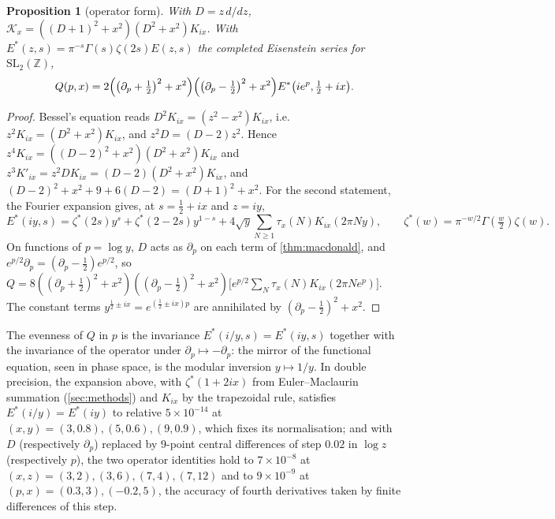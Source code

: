 \documentclass[11pt]{article}
\newtheorem{proposition}[theorem]{Proposition}
\theoremstyle{definition}\newtheorem{definition}[theorem]{Definition}
\theoremstyle{remark}\newtheorem{remark}[theorem]{Remark}
\begin{document}
\begin{proposition}[operator form]\label{prop:operator}
With $D=z\,d/dz$, $\mathcal K_x=((D+1)^2+x^2)(D^2+x^2)K_{ix}$. With $E^*(z,s)=\pi^{-s}\Gamma(s)\zeta(2s)E(z,s)$ the completed Eisenstein series for $\mathrm{SL}_2(\mathbb Z)$,
\[
Q(p,x)=2\Bigl(\bigl(\partial_p+\tfrac12\bigr)^2+x^2\Bigr)\Bigl(\bigl(\partial_p-\tfrac12\bigr)^2+x^2\Bigr)E^*\bigl(ie^p,\tfrac12+ix\bigr).
\]
\end{proposition}
\begin{proof}
Bessel's equation reads $D^2K_{ix}=(z^2-x^2)K_{ix}$, i.e.\ $z^2K_{ix}=(D^2+x^2)K_{ix}$, and $z^2D=(D-2)z^2$. Hence $z^4K_{ix}=((D-2)^2+x^2)(D^2+x^2)K_{ix}$ and $z^3K'_{ix}=z^2DK_{ix}=(D-2)(D^2+x^2)K_{ix}$, and $(D-2)^2+x^2+9+6(D-2)=(D+1)^2+x^2$. For the second statement, the Fourier expansion \cite[\S3.4]{Iwaniec} gives, at $s=\frac12+ix$ and $z=iy$,
\[
E^*(iy,s)=\zeta^*(2s)y^s+\zeta^*(2-2s)y^{1-s}+4\sqrt y\sum_{N\ge1}\tau_x(N)K_{ix}(2\pi Ny),\qquad\zeta^*(w)=\pi^{-w/2}\Gamma(\tfrac w2)\zeta(w).
\]
On functions of $p=\log y$, $D$ acts as $\partial_p$ on each term of \cref{thm:macdonald}, and $e^{p/2}\partial_p=(\partial_p-\frac12)e^{p/2}$, so $Q=8((\partial_p+\frac12)^2+x^2)((\partial_p-\frac12)^2+x^2)\bigl[e^{p/2}\sum_N\tau_x(N)K_{ix}(2\pi Ne^p)\bigr]$. The constant terms $y^{\frac12\pm ix}=e^{(\frac12\pm ix)p}$ are annihilated by $(\partial_p-\frac12)^2+x^2$.
\end{proof}
The evenness of $Q$ in $p$ is the invariance $E^*(i/y,s)=E^*(iy,s)$ together with the invariance of the operator under $\partial_p\mapsto-\partial_p$: the mirror of the functional equation, seen in phase space, is the modular inversion $y\mapsto1/y$. In double precision, the expansion above, with $\zeta^*(1+2ix)$ from Euler--Maclaurin summation (\cref{sec:methods}) and $K_{ix}$ by the trapezoidal rule, satisfies $E^*(i/y)=E^*(iy)$ to relative $5\times10^{-14}$ at $(x,y)=(3,0.8),(5,0.6),(9,0.9)$, which fixes its normalisation; and with $D$ (respectively $\partial_p$) replaced by 9-point central differences of step $0.02$ in $\log z$ (respectively $p$), the two operator identities hold to $7\times10^{-8}$ at $(x,z)=(3,2),(3,6),(7,4),(7,12)$ and to $9\times10^{-9}$ at $(p,x)=(0.3,3),(-0.2,5)$, the accuracy of fourth derivatives taken by finite differences of this step.
\end{document}
